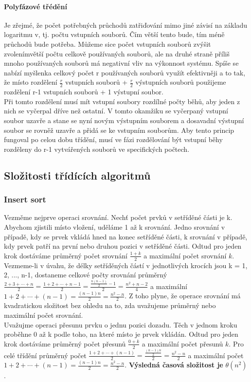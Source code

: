 \documentclass[10pt,a4paper]{article}
\begin{document}
\paragraph{Polyfázové třédění}
Je zřejmé, že počet potřebných průchodů zatřiďování mimo jiné závisí na základu logaritmu v, tj. počtu vstupních souborů. Čím větší tento bude, tím méně průchodů bude potřeba. Můžeme sice počet vstupních souborů zvýšit zvolenímvětší počtu celkově používaných souborů, ale na druhé straně příliš mnoho používaných souborů má negativní vliv na výkonnost systému. Spíše se nabízí myšlenka celkový počet r používaných souborů využít efektivněji a to tak, že místo rozdělení $\frac{r}{2}$ vstupních souborů + $\frac{r}{2}$ výstupních souborů použijeme rozdělení r-1 vstupních souborů + 1 výstupní soubor. \\
Při tomto rozdělení musí mít vstupní soubory rozdílné počty běhů, aby jeden z nich se vyčerpal dříve než ostatní. V tomto okamžiku se vyčerpaný vstupní soubor uzavře a stane se nyní novým výstupním souborem a dosavadní výstupní soubor se rovněž uzavře a přidá se ke vstupním souborům. Aby tento princip fungoval po celou dobu třídění, musí ve fázi rozdělování být vstupní běhy rozděleny do r-1 vytvářených souborů ve specifických počtech.





\subsection{Složitosti třídících algoritmů}
\subsubsection{Insert sort}
Vezměme nejprve operaci srovnání. Nechť počet prvků v setříděné části je k. Abychom zjistili místo vložení, uděláme 1 až k srovnání. Jedno srovnání v případě, kdy se prvek vkládá hned na konec setříděné části, k srovnání v případě, kdy prvek patří na první nebo druhou pozici v setříděné části. Odtud pro jeden krok dostáváme průměrný počet srovnání $\frac{1+k}{2}$ a maximální počet srovnání $k$. Vezmeme-li v úvahu, že délky setříděných částí v jednotlivých krocích jsou k = 1, 2, ..., n-1, dostaneme celkové počty srovnání průměrný $\frac{2+3+\cdots+n}{2} = \frac{1+2+\cdots+n-1}{2} = \frac{\frac{n(n-1)}{2}-1}{2} = \frac{n^2+n-2}{4}$ a maximální $1+2+\cdots+(n-1) = \frac{(n-1)n}{2} = \frac{n^2-n}{2}$. Z toho plyne, že operace srovnání má kvadratickou složitost bez ohledu na to, zda uvažujeme průměrný nebo maximální počet srovnání. \\
Uvažujme operaci přesunu prvku o jednu pozici dozadu. Těch v jednom kroku proběhne 0 až k podle toho, na které místo je prvek vkládán. Odtud pro jeden krok dostáváme průměrný počet přesunů $\frac{0+k}{2}$ a maximální počet přesunů $k$. Pro celé třídění průměrný počet $\frac{1+2+\cdots+(n-1)}{2} = \frac{\frac{(n-1)n}{2}}{2} = \frac{n^2-n}{2}$ a maximální počet $1+2+\cdots+(n-1) = \frac{(n-1)n}{2} = \frac{n^2-n}{2}$. \textbf{Výsledná časová složitost je} $\theta (n^2)$.
\end{document}
